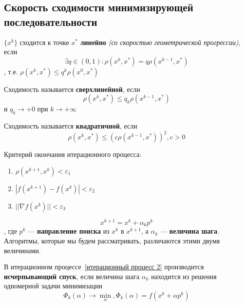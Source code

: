 \subsection{Скорость сходимости минимизирующей последовательности}

\begin{definition}
    \(\{x^k\} \) сходится к точке \(x^*\) \textbf{линейно} \textit{(со скоростью геометрической прогрессии)}, если
    \[\exists q \in (0, 1) : \rho(x^k, x^*) = q \rho(x^{k - 1}, x^*)\]
    , т.е. \(\rho(x^k, x^*) \leq q^k \rho(x^0, x^*)\)
\end{definition}

\begin{definition}
    Сходимость называется \textbf{сверхлинейной}, если
    \[\rho(x^k, x^*) \leq q_k \rho(x^{k - 1}, x^*)\]
    и \(q_k \to + 0\) при \(k \to +\infty\)
\end{definition}

\begin{definition}
    Сходимость называется \textbf{квадратичной}, если
    \[\rho(x^k, x^*) \leq (c \rho(x^{k - 1}, x^*))^2, c > 0\]
\end{definition}

Критерий окончания итерационного процесса:
\begin{enumerate}
    \item \(\rho(x^{k + 1}, x^k) < \varepsilon_1\)
    \item \(|f(x^{k + 1}) - f(x^k)| < \varepsilon_2\)
    \item \(||\nabla f(x^k)|| < \varepsilon_3\)
\end{enumerate}

\begin{equation}
    x^{k + 1} = x^k + \alpha_k p^k
    \label{итерационный процесс 2}
\end{equation}
, где \(p^k\) --- \textbf{направление поиска} из \(x^k\) в \(x^{k + 1}\), а \(\alpha_k\) --- \textbf{величина шага}. Алгоритмы, которые мы будем рассматривать, различаются этими двумя величинами.

\begin{definition}
    В итерационном процессе~\eqref{итерационный процесс 2} производится \textbf{исчерпывающий спуск}, если величина шага \(\alpha_k\) находится из решения одномерной задачи минимизации
    \begin{equation}
        \Phi_k(\alpha) \to \min_\alpha, \Phi_k(\alpha) = f(x^k + \alpha p^k)
        \label{исчерпывающий спуск}
    \end{equation}
\end{definition}

